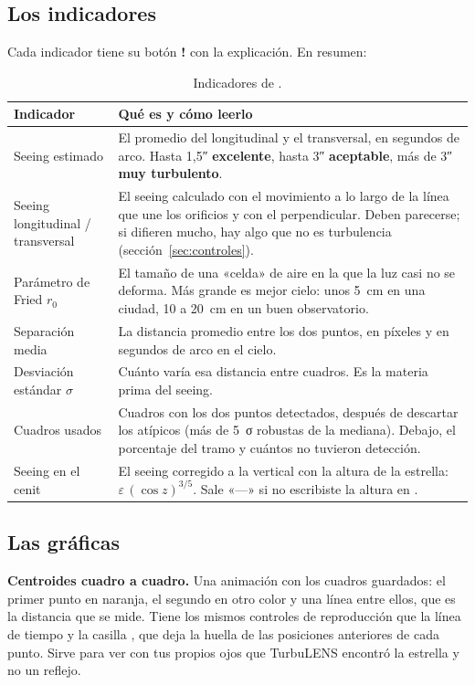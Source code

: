 \subsection{Los indicadores}

Cada indicador tiene su botón \textbf{!} con la explicación. En resumen:

\begin{table}[H]
\centering\small
\begin{tabularx}{\linewidth}{@{}l Y@{}}
\toprule
Indicador & Qué es y cómo leerlo\\
\midrule
Seeing estimado & El promedio del longitudinal y el transversal, en segundos de arco. Hasta 1,5″
\textcolor{acento}{\textbf{excelente}}, hasta 3″ \textcolor{cobre}{\textbf{aceptable}}, más de 3″
\textcolor{red!70!black}{\textbf{muy turbulento}}.\\
Seeing longitudinal / transversal & El seeing calculado con el movimiento a lo largo de la línea que une los orificios
y con el perpendicular. Deben parecerse; si difieren mucho, hay algo que no es turbulencia (sección~\ref{sec:controles}).\\
Parámetro de Fried $r_0$ & El tamaño de una «celda» de aire en la que la luz casi no se deforma. Más grande es mejor
cielo: unos 5~cm en una ciudad, 10 a 20~cm en un buen observatorio.\\
Separación media & La distancia promedio entre los dos puntos, en píxeles y en segundos de arco en el cielo.\\
Desviación estándar $\sigma$ & Cuánto varía esa distancia entre cuadros. Es la materia prima del seeing.\\
Cuadros usados & Cuadros con los dos puntos detectados, después de descartar los atípicos (más de 5~σ robustas de la
mediana). Debajo, el porcentaje del tramo y cuántos no tuvieron detección.\\
Seeing en el cenit & El seeing corregido a la vertical con la altura de la estrella: $\varepsilon\,(\cos z)^{3/5}$. Sale
«—» si no escribiste la altura en .\\
\bottomrule
\end{tabularx}
\caption{Indicadores de .}
\end{table}

\subsection{Las gráficas}

\textbf{Centroides cuadro a cuadro.} Una animación con los cuadros guardados: el primer punto en naranja, el segundo en
otro color y una línea entre ellos, que es la distancia que se mide. Tiene los mismos controles de reproducción que la
línea de tiempo y la casilla , que deja la huella de las posiciones anteriores de cada punto. Sirve para ver con tus propios
ojos que TurbuLENS encontró la estrella y no un reflejo.

